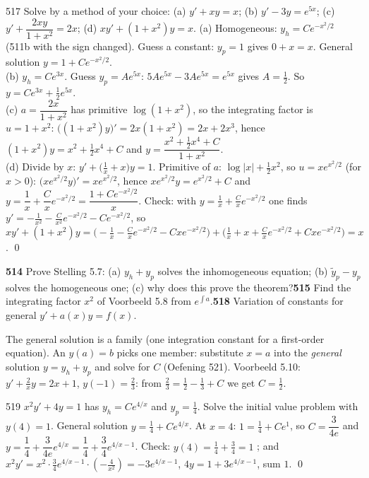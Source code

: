\begin{bookex}{517}
Solve by a method of your choice: (a) $y'+xy=x$; (b) $y'-3y=e^{5x}$; (c) $y'+\dfrac{2xy}{1+x^2}=2x$; (d) $xy'+(1+x^2)y=x$.
\solution
(a) Homogeneous: $y_h=Ce^{-x^2/2}$ (511b with the sign changed). Guess a constant: $y_p=1$ gives $0+x=x$. General solution $y=1+Ce^{-x^2/2}$.\\
(b) $y_h=Ce^{3x}$. Guess $y_p=Ae^{5x}$: $5Ae^{5x}-3Ae^{5x}=e^{5x}$ gives $A=\frac12$. So $y=Ce^{3x}+\frac12e^{5x}$.\\
(c) $a=\dfrac{2x}{1+x^2}$ has primitive $\log(1+x^2)$, so the integrating factor is $u=1+x^2$: $\big((1+x^2)y\big)'=2x(1+x^2)=2x+2x^3$, hence $(1+x^2)y=x^2+\frac12x^4+C$ and $y=\dfrac{x^2+\frac12x^4+C}{1+x^2}$.\\
(d) Divide by $x$: $y'+\big(\frac1x+x\big)y=1$. Primitive of $a$: $\log|x|+\frac12x^2$, so $u=xe^{x^2/2}$ (for $x>0$): $\big(xe^{x^2/2}y\big)'=xe^{x^2/2}$, hence $xe^{x^2/2}y=e^{x^2/2}+C$ and $y=\dfrac1x+\dfrac{C}{x}e^{-x^2/2}=\dfrac{1+Ce^{-x^2/2}}x$. Check: with $y=\frac1x+\frac Cxe^{-x^2/2}$ one finds $y'=-\frac1{x^2}-\frac C{x^2}e^{-x^2/2}-Ce^{-x^2/2}$, so $xy'+(1+x^2)y=\big(-\frac1x-\frac Cxe^{-x^2/2}-Cxe^{-x^2/2}\big)+\big(\frac1x+x+\frac Cxe^{-x^2/2}+Cxe^{-x^2/2}\big)=x$. \checkmark\qed
\end{bookex}

\begin{trybox}[{514, 515, 518}]
\textbf{514} Prove Stelling 5.7: (a) $y_h+y_p$ solves the inhomogeneous equation; (b) $\tilde y_p-y_p$ solves the homogeneous one; (c) why does this prove the theorem?\quad \textbf{515} Find the integrating factor $x^2$ of Voorbeeld 5.8 from $e^{\int a}$.\quad \textbf{518} Variation of constants for general $y'+a(x)y=f(x)$.
\end{trybox}

\begin{key}
The general solution is a family (one integration constant for a first-order equation). An  $y(a)=b$ picks one member: substitute $x=a$ into the \emph{general} solution $y=y_h+y_p$ and solve for $C$ (Oefening 521). Voorbeeld 5.10: $y'+\frac2xy=2x+1$, $y(-1)=\frac23$: from $\frac23=\frac12-\frac13+C$ we get $C=\frac12$.
\end{key}

\begin{bookex}{519}
$x^2y'+4y=1$ has $y_h=Ce^{4/x}$ and $y_p=\frac14$. Solve the initial value problem with $y(4)=1$.
\solution
General solution $y=\frac14+Ce^{4/x}$. At $x=4$: $1=\frac14+Ce^{1}$, so $C=\dfrac3{4e}$ and $y=\dfrac14+\dfrac3{4e}e^{4/x}=\dfrac14+\dfrac34e^{4/x-1}$. Check: $y(4)=\frac14+\frac34=1$ \checkmark; and $x^2y'=x^2\cdot\frac34e^{4/x-1}\cdot(-\frac4{x^2})=-3e^{4/x-1}$, $4y=1+3e^{4/x-1}$, sum $1$. \checkmark\qed
\end{bookex}


